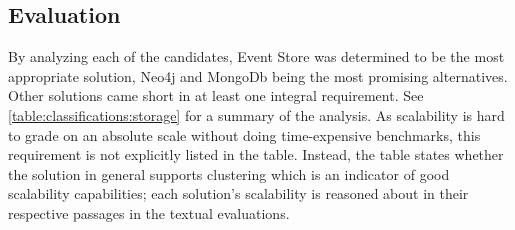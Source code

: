 \subsection{Evaluation}

By analyzing each of the candidates, Event Store was determined to be the most appropriate solution, Neo4j and MongoDb being the most promising alternatives.
Other solutions came short in at least one integral requirement.
See \cref{table:classifications:storage} for a summary of the analysis.
As scalability is hard to grade on an absolute scale without doing time-expensive benchmarks, this requirement is not explicitly listed in the table.
Instead, the table states whether the solution in general supports clustering which is an indicator of good scalability capabilities; each solution's scalability is reasoned about in their respective passages in the textual evaluations.

\begin{table}[t]
\centering
\caption[Classification of storage solutions]{Classification of storage solutions; the requirements regarding basic storage capabilities and modifying data are not listed because all solutions satisfy these.}
\label{table:classifications:storage}
\end{table}

